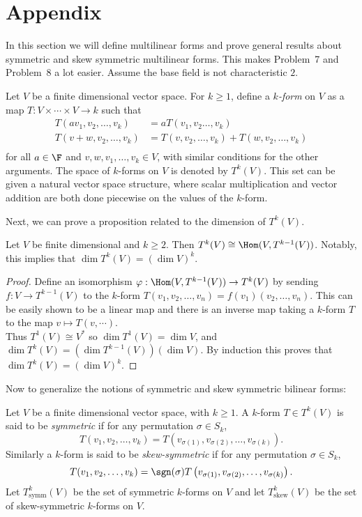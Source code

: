 \appendix
\section{Appendix}
In this section we will define multilinear forms and prove general results about symmetric and skew symmetric multilinear forms. This makes Problem~7 and Problem~8 a lot easier. Assume the base field is not characteristic $2$.
\begin{definition}\label{kform}
  Let $V$ be a finite dimensional vector space. For $k\geq 1$, define a {\em $k$-form} on $V$ as a map $T : V\times\cdots\times V \to k$ such that
  \[
    \begin{aligned}
      T(av_1,v_2,\ldots,v_k) &= aT(v_1,v_2\ldots,v_k)\\
      T(v+w,v_2,\ldots,v_k) &= T(v,v_2,\ldots,v_k) + T(w,v_2,\ldots,v_k)\\
    \end{aligned} 
  \]
  for all $a\in \F$ and $v,w,v_1,\ldots,v_k\in V$, with similar conditions for the other arguments. The space of $k$-forms on $V$ is denoted by $T^k(V)$. This set can be given a natural vector space structure, where scalar multiplication and vector addition are both done piecewise on the values of the $k$-form.
\end{definition}

Next, we can prove a proposition related to the dimension of $T^k(V)$.
\begin{proposition}\label{dimension}
  Let $V$ be finite dimensional and $k\geq 2$. Then $T^k(V)\cong \Hom(V, T^{k-1}(V))$. Notably, this implies that $\dim T^k(V) = \left(\dim V\right)^k$.   
\end{proposition}
\begin{proof}
  Define an isomorphism $\varphi : \Hom(V, T^{k-1}(V)) \to T^k(V)$ by sending $f : V \to T^{k-1}(V)$ to the $k$-form $T(v_1,v_2,\ldots,v_n) = f(v_1)(v_2,\ldots,v_n)$. This can be easily shown to be a linear map and there is an inverse map taking a $k$-form $T$ to the map $v \mapsto T(v,\cdots)$.\\

  Thus $T^1(V)\cong V^*$ so $\dim T^1(V) = \dim V$, and $\dim T^k(V) = (\dim T^{k-1}(V))(\dim V)$. By induction this proves that $\dim T^k(V)=\left(\dim V\right)^k$.  
\end{proof}

Now to generalize the notions of symmetric and skew symmetric bilinear forms:

\begin{definition}\label{symm}
  Let $V$ be a finite dimensional vector space, with $k\geq 1$. A $k$-form $T\in T^k(V)$ is said to be {\em symmetric} if for any permutation $\sigma\in S_k$,
  \[
    T(v_1,v_2,\ldots, v_k) = T\left(v_{\sigma(1)}, v_{\sigma(2)}, \ldots, v_{\sigma(k)}\right)
  .\] 
 Similarly a $k$-form is said to be {\em skew-symmetric} if for any permutation $\sigma\in S_k$,
  \[
    T(v_1,v_2,\ldots, v_k) = \sgn(\sigma)T\left(v_{\sigma(1)}, v_{\sigma(2)}, \ldots, v_{\sigma(k)}\right)
  .\] 
  Let $T^k_{\mathrm{symm}}(V)$ be the set of symmetric $k$-forms on $V$ and let $T^k_{\mathrm{skew}}(V)$ be the set of skew-symmetric $k$-forms on $V$. 
\end{definition}

